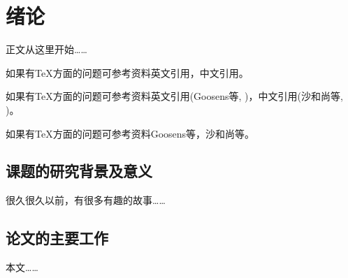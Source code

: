 \chapter{绪论}
\label{chap:introduction}

正文从这里开始……

如果有TeX方面的问题可参考资料英文引用\cite{companion}，中文引用\cite{shaheshang}。

如果有TeX方面的问题可参考资料英文引用(Goosens等, \citeyear{companion})，中文引用(沙和尚等, \citeyear{shaheshang})。

如果有TeX方面的问题可参考资料Goosens等\citeyearpar{companion}，沙和尚等\citeyearpar{shaheshang}。

\section{课题的研究背景及意义}

很久很久以前\cite{tex}，有很多有趣的故事\cite{cnproceed,cnarticle,zhubajie,shaheshang}……

\section{论文的主要工作}

本文……
